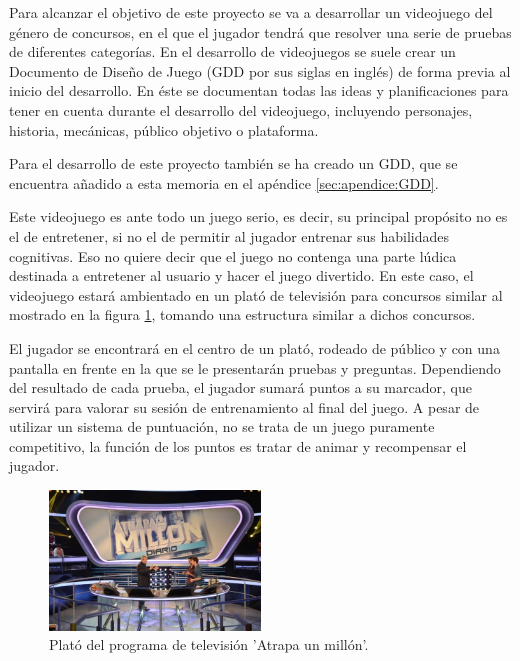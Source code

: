 
\minitoc


Para alcanzar el objetivo de este proyecto se va a desarrollar un videojuego del género de concursos, en el que el jugador tendrá que resolver una serie de pruebas de diferentes categorías. En el desarrollo de videojuegos se suele crear un Documento de Diseño de Juego (GDD por sus siglas en inglés) de forma previa al inicio del desarrollo. En éste se documentan todas las ideas y planificaciones para tener en cuenta durante el desarrollo del videojuego, incluyendo personajes, historia, mecánicas, público objetivo o plataforma. 

Para el desarrollo de este proyecto también se ha creado un GDD, que se encuentra añadido a esta memoria en el apéndice \ref{sec:apendice:GDD}.

Este videojuego es ante todo un juego serio, es decir, su principal propósito no es el de entretener, si no el de permitir al jugador entrenar sus habilidades cognitivas. Eso no quiere decir que el juego no contenga una parte lúdica destinada a entretener al usuario y hacer el juego divertido. En este caso, el videojuego estará ambientado en un plató de televisión para concursos similar al mostrado en la figura \ref{fig:AI_atrapaMillon}, tomando una estructura similar a dichos concursos. 

El jugador se encontrará en el centro de un plató, rodeado de público y con una pantalla en frente en la que se le presentarán pruebas y preguntas. Dependiendo del resultado de cada prueba, el jugador sumará puntos a su marcador, que servirá para valorar su sesión de entrenamiento al final del juego. A pesar de utilizar un sistema de puntuación, no se trata de un juego puramente competitivo, la función de los puntos es tratar de animar y recompensar el jugador.

\begin{figure}
  \centering
    \includegraphics[width=0.5\textwidth]{03.EstudioProblema/02.AnalisisInicial/00.Figuras/01.atrapa_un_millon.jpg}
    \caption{Plató del programa de televisión 'Atrapa un millón'. \cite{AI_img_atrapaMillon}}
    \label{fig:AI_atrapaMillon}
\end{figure}

